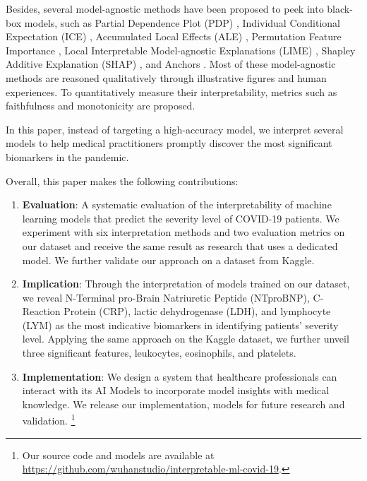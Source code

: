 Besides, several model-agnostic methods have been proposed to peek into black-box models, such as Partial Dependence Plot (PDP) \cite{Friedman2001GreedyFA}, Individual Conditional Expectation (ICE) \cite{goldstein2013peeking}, Accumulated Local Effects (ALE) \cite{apley2016visualizing}, Permutation Feature Importance \cite{fisher2018models}, Local Interpretable Model-agnostic Explanations (LIME) \cite{ribeiro2016i}, Shapley Additive Explanation (SHAP) \cite{lundberg2017unified}, and Anchors \cite{Ribeiro2018AnchorsHM}. Most of these model-agnostic methods are reasoned qualitatively through illustrative figures and human experiences. To quantitatively measure their interpretability, metrics such as faithfulness \cite{alvarezmelis2018robust} and monotonicity \cite{luss2019generating} are proposed.

In this paper, instead of targeting a high-accuracy model, we interpret several models to help medical practitioners promptly discover the most significant biomarkers in the pandemic.

Overall, this paper makes the following contributions:

\begin{enumerate}
    \item \textbf{Evaluation}: A systematic evaluation of the interpretability of machine learning models that predict the severity level of COVID-19 patients. We experiment with six interpretation methods and two evaluation metrics on our dataset and receive the same result as research that uses a dedicated model. We further validate our approach on a dataset from Kaggle.

    \item \textbf{Implication}: Through the interpretation of models trained on our dataset, we reveal N-Terminal pro-Brain Natriuretic Peptide (NTproBNP), C-Reaction Protein (CRP), lactic dehydrogenase (LDH), and lymphocyte (LYM) as the most indicative biomarkers in identifying patients' severity level. Applying the same approach on the Kaggle dataset, we further unveil three significant features, leukocytes, eosinophils, and platelets.

    \item \textbf{Implementation}: We design a system that healthcare professionals can interact with its AI Models to incorporate model insights with medical knowledge. We release our implementation, models for future research and validation. \footnote{Our source code and models are available at \url{https://github.com/wuhanstudio/interpretable-ml-covid-19}.}
\end{enumerate}

